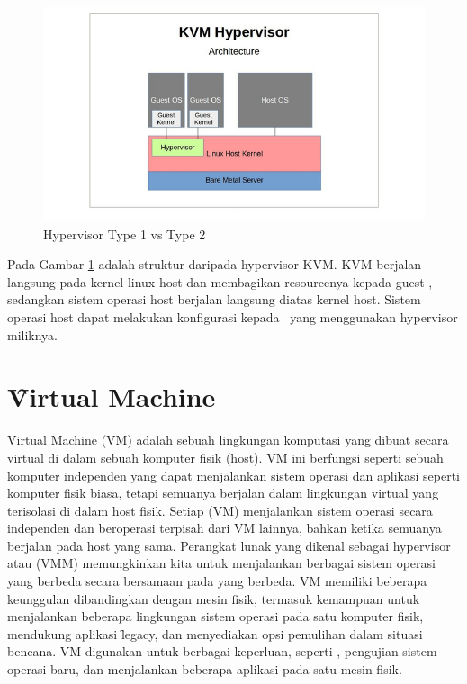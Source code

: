 \begin{figure}
	\centering
	\includegraphics[width=1\textwidth]
		{assets/pics/xen-kvm.png}
	\caption{Hypervisor Type 1 vs Type 2}
	\label{fig:xen-kvm}
\end{figure}

Pada Gambar \ref{fig:xen-kvm} adalah struktur daripada hypervisor KVM. KVM berjalan langsung pada kernel linux host dan membagikan resourcenya kepada guest \vm, sedangkan sistem operasi host berjalan langsung diatas kernel host. Sistem operasi host dapat melakukan konfigurasi kepada \vm\ yang menggunakan hypervisor miliknya.

\section{\f{Virtual Machine}}

\hspace{0.5cm} Virtual Machine (VM) adalah sebuah lingkungan komputasi yang dibuat secara virtual di dalam sebuah komputer fisik (host)\cite{Pradilla2016}. VM ini berfungsi seperti sebuah komputer independen yang dapat menjalankan sistem operasi dan aplikasi seperti komputer fisik biasa, tetapi semuanya berjalan dalam lingkungan virtual yang terisolasi di dalam host fisik. Setiap \vm (VM) menjalankan sistem operasi secara independen dan beroperasi terpisah dari VM lainnya, bahkan ketika semuanya berjalan pada host yang sama. Perangkat lunak yang dikenal sebagai hypervisor atau \vmm (VMM) memungkinkan kita untuk menjalankan berbagai sistem operasi yang berbeda secara bersamaan pada \vm yang berbeda. VM memiliki beberapa keunggulan dibandingkan dengan mesin fisik, termasuk kemampuan untuk menjalankan beberapa lingkungan sistem operasi pada satu komputer fisik, mendukung aplikasi \f{legacy}, dan menyediakan opsi pemulihan dalam situasi bencana. VM digunakan untuk berbagai keperluan, seperti \cc, pengujian sistem operasi baru, dan menjalankan beberapa aplikasi pada satu mesin fisik\cite{ibmWhatVirtualMachine}.

